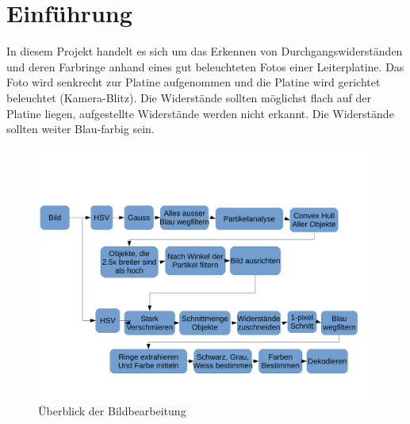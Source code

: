 \section{Einf\"uhrung}

In diesem Projekt handelt es sich um das Erkennen von Durchgangswiderst\"anden
und deren Farbringe anhand eines gut beleuchteten  Fotos  einer Leiterplatine.
Das Foto wird senkrecht zur Platine aufgenommen und die Platine wird gerichtet
beleuchtet (Kamera-Blitz). Die Widerst\"ande sollten m\"oglichst flach auf der
Platine  liegen,   aufgestellte   Widerst\"ande   werden  nicht  erkannt.  Die
Widerst\"ande sollten weiter Blau-farbig sein.

\begin{figure}[H]
    \centering
    \includegraphics[width=\linewidth]{images/flow}
    \caption{\"Uberblick der Bildbearbeitung}
\end{figure}

